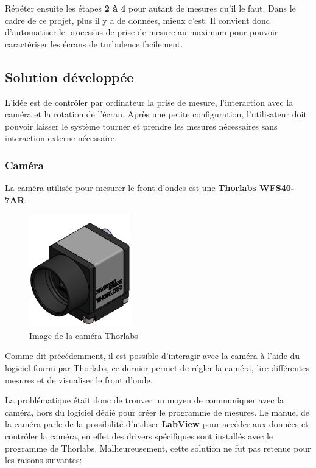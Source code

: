 Répéter ensuite les étapes \textbf{2 à 4} pour autant de mesures qu'il le faut.
Dans le cadre de ce projet, plus il y a de données, mieux c'est. Il convient donc d'automatiser le
processus de prise de mesure au maximum pour pouvoir caractériser les écrans de turbulence facilement.

\subsection{Solution développée}
L'idée est de contrôler par ordinateur la prise de mesure, l'interaction avec la caméra et la rotation de l'écran.
Après une petite configuration, l'utilisateur doit pouvoir laisser le système tourner et prendre les mesures nécessaires sans
interaction externe nécessaire.

\subsubsection{Caméra}

La caméra utilisée pour mesurer le front d'ondes est une \textbf{Thorlabs WFS40-7AR}:
\begin{figure}[H]
    \centering
    \includegraphics[width=0.4\textwidth]{assets/figures/ameliorations/thorlabs_40_7AR.png}
    \caption[Image de la caméra Thorlabs]{Image de la caméra Thorlabs \autocite{Camera_thorlabs_photo}}\label{fig:camera_thorlabs}
\end{figure}

Comme dit précédemment, il est possible d'interagir avec la caméra à l'aide du logiciel fourni par Thorlabs, ce dernier permet de régler
la caméra, lire différentes mesures et de visualiser le front d'onde.

La problématique était donc de trouver un moyen de communiquer avec la caméra, hors du logiciel dédié pour créer le programme de mesures.
Le manuel de la caméra parle de la possibilité d'utiliser \textbf{LabView} pour accéder aux données et contrôler la caméra, en effet des
drivers spécifiques sont installés avec le programme de Thorlabs. Malheureusement, cette solution ne fut pas retenue pour les raisons suivantes:


